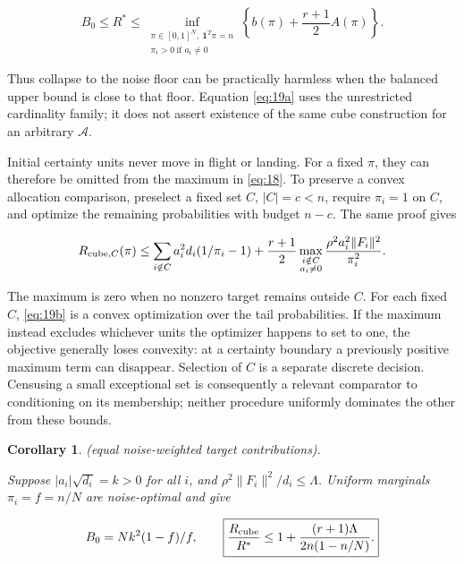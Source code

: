 \documentclass[11pt]{article}
\newtheorem{corollary}[theorem]{Corollary}
\begin{document}
\begin{equation}\label{eq:19a}
B_0\le R^*\le
\inf_{\substack{\pi\in[0,1]^N,\ \mathbf1^T\pi=n\\
\pi_i>0\ \text{if }a_i\ne0}}
\left\{b(\pi)+\frac{r+1}{2}A(\pi)\right\}. 
\end{equation}

Thus collapse to the noise floor can be practically harmless when the
balanced upper bound is close to that floor. Equation \eqref{eq:19a}
uses the unrestricted cardinality family; it does not assert existence
of the same cube construction for an arbitrary \(\mathcal A\).

Initial certainty units never move in flight or landing. For a fixed
\(\pi\), they can therefore be omitted from the maximum in
\eqref{eq:18}. To preserve a convex allocation comparison, preselect a
fixed set \(C\), \(|C|=c<n\), require \(\pi_i=1\) on \(C\), and optimize
the remaining probabilities with budget \(n-c\). The same proof gives

\begin{equation}\label{eq:19b}
R_{{\rm cube},C}(\pi)\le
\sum_{i\notin C}a_i^2d_i(1/\pi_i-1)
+\frac{r+1}{2}\max_{\substack{i\notin C\\a_i\ne0}}
\frac{\rho^2a_i^2\|F_i\|^2}{\pi_i^2}. 
\end{equation}

The maximum is zero when no nonzero target remains outside \(C\). For
each fixed \(C\), \eqref{eq:19b} is a convex optimization over the tail
probabilities. If the maximum instead excludes whichever units the
optimizer happens to set to one, the objective generally loses
convexity: at a certainty boundary a previously positive maximum term
can disappear. Selection of \(C\) is a separate discrete decision.
Censusing a small exceptional set is consequently a relevant comparator
to conditioning on its membership; neither procedure uniformly dominates
the other from these bounds.

\begin{corollary}\label{th:4} (equal noise-weighted target contributions).

Suppose \(|a_i|\sqrt{d_i}=k>0\) for all \(i\), and
\(\rho^2\|F_i\|^2/d_i\le\Lambda\). Uniform marginals \(\pi_i=f=n/N\) are
noise-optimal and give

\begin{equation}\label{eq:23}
B_0=Nk^2(1-f)/f,
\qquad
\boxed{\frac{R_{\rm cube}}{R^*}
\le1+\frac{(r+1)\Lambda}{2n(1-n/N)}.} 
\end{equation}

\end{corollary}
\end{document}
